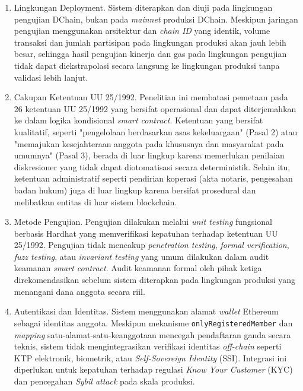 \begin{enumerate}
	\item Lingkungan Deployment. Sistem diterapkan dan diuji pada lingkungan pengujian DChain, bukan pada \textit{mainnet} produksi DChain. Meskipun jaringan pengujian menggunakan arsitektur dan \textit{chain ID} yang identik, volume transaksi dan jumlah partisipan pada lingkungan produksi akan jauh lebih besar, sehingga hasil pengujian kinerja dan gas pada lingkungan pengujian tidak dapat diekstrapolasi secara langsung ke lingkungan produksi tanpa validasi lebih lanjut.

	\item Cakupan Ketentuan UU 25/1992. Penelitian ini membatasi pemetaan pada 26 ketentuan UU 25/1992 yang bersifat operasional dan dapat diterjemahkan ke dalam logika kondisional \textit{smart contract}. Ketentuan yang bersifat kualitatif, seperti "pengelolaan berdasarkan asas kekeluargaan" (Pasal 2) atau "memajukan kesejahteraan anggota pada khususnya dan masyarakat pada umumnya" (Pasal 3), berada di luar lingkup karena memerlukan penilaian diskresioner yang tidak dapat diotomatisasi secara deterministik. Selain itu, ketentuan administratif seperti pendirian koperasi (akta notaris, pengesahan badan hukum) juga di luar lingkup karena bersifat prosedural dan melibatkan entitas di luar sistem blockchain.

	\item Metode Pengujian. Pengujian dilakukan melalui \textit{unit testing} fungsional berbasis Hardhat yang memverifikasi kepatuhan terhadap ketentuan UU 25/1992. Pengujian tidak mencakup \textit{penetration testing}, \textit{formal verification}, \textit{fuzz testing}, atau \textit{invariant testing} yang umum dilakukan dalam audit keamanan \textit{smart contract}. Audit keamanan formal oleh pihak ketiga direkomendasikan sebelum sistem diterapkan pada lingkungan produksi yang menangani dana anggota secara riil.

	\item Autentikasi dan Identitas. Sistem menggunakan alamat \textit{wallet} Ethereum sebagai identitas anggota. Meskipun mekanisme \texttt{onlyRegisteredMember} dan \textit{mapping} satu-alamat-satu-keanggotaan mencegah pendaftaran ganda secara teknis, sistem tidak mengintegrasikan verifikasi identitas \textit{off-chain} seperti KTP elektronik, biometrik, atau \textit{Self-Sovereign Identity} (SSI). Integrasi ini diperlukan untuk kepatuhan terhadap regulasi \textit{Know Your Customer} (KYC) dan pencegahan \textit{Sybil attack} pada skala produksi.


\end{enumerate}
